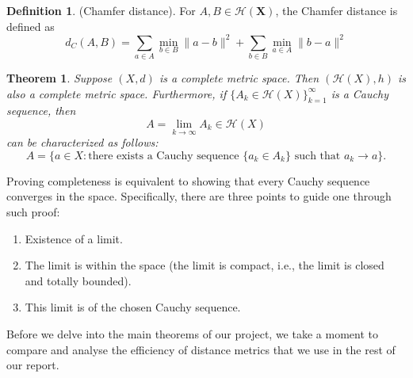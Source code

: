 \documentclass[a4paper,11pt, titlepage]{article}
\theoremstyle{definition}
\newtheorem{definition}{Definition}[section]
\theoremstyle{plain}
\newtheorem{theorem}{Theorem}[section]
\theoremstyle{remark}
\theoremstyle{definition}
\begin{document}
\begin{definition}{(Chamfer distance).}
For $A, B \in \mathcal{H}(\mathbf{X})$, the Chamfer distance is defined as
\[
d_C(A, B) = \sum_{a \in A} \min_{b \in B} \| a - b \|^2 + \sum_{b \in B} \min_{a \in A} \| b - a \|^2
\]
\end{definition}

\begin{theorem}
Suppose $(X, d)$ is a complete metric space. Then $(\mathcal{H}(X), h)$ is also a complete metric space. Furthermore, if $\{A_k \in \mathcal{H}(X)\}_{k=1}^{\infty}$ is a Cauchy sequence, then
\[
A = \lim_{k \to \infty} A_k \in \mathcal{H}(X)
\]
can be characterized as follows:
\[
A = \{a \in X : \text{there exists a Cauchy sequence } \{a_k \in A_k\} \text{ such that } a_k \to a\}.
\]
\end{theorem}
Proving completeness is equivalent to showing that every Cauchy sequence converges in the space. Specifically, there are three points to guide one through such proof:

\begin{enumerate}
    \item Existence of a limit.
    \item The limit is within the space (the limit is compact, i.e., the limit is closed and totally bounded).
    \item This limit is of the chosen Cauchy sequence.
\end{enumerate}

Before we delve into the main theorems of our project, we take a moment to compare and analyse the efficiency of distance metrics that we use in the rest of our report.
\end{document}
